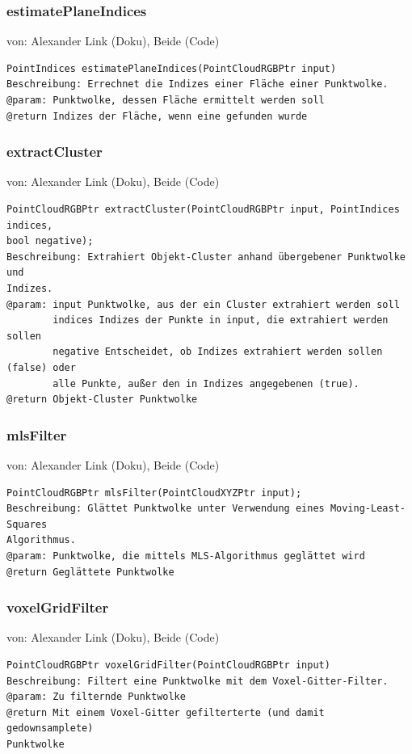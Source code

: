 \documentclass{suturo}
\makeatletter
\newcommand{\chapterauthor}[1]{%
  {\parindent0pt\vspace*{-27pt}%
  \linespread{0}\small\begin{flushright}von: #1\end{flushright}%
  \par\nobreak\vspace*{0pt}}
  \@afterheading%
}
\makeatother
\begin{document}
\subsubsection{estimatePlaneIndices}
\chapterauthor{Alexander Link (Doku), Beide (Code)}
\begin{verbatim}
PointIndices estimatePlaneIndices(PointCloudRGBPtr input)
Beschreibung: Errechnet die Indizes einer Fläche einer Punktwolke.
@param: Punktwolke, dessen Fläche ermittelt werden soll
@return Indizes der Fläche, wenn eine gefunden wurde
\end{verbatim}\label{func:estimateplaneindices}

\subsubsection{extractCluster}
\chapterauthor{Alexander Link (Doku), Beide (Code)}
\begin{verbatim}
PointCloudRGBPtr extractCluster(PointCloudRGBPtr input, PointIndices indices, 
bool negative);
Beschreibung: Extrahiert Objekt-Cluster anhand übergebener Punktwolke und
Indizes.
@param: input Punktwolke, aus der ein Cluster extrahiert werden soll
		indices Indizes der Punkte in input, die extrahiert werden sollen
		negative Entscheidet, ob Indizes extrahiert werden sollen (false) oder
		alle Punkte, außer den in Indizes angegebenen (true).
@return Objekt-Cluster Punktwolke
\end{verbatim}\label{func:extractcluster}

\subsubsection{mlsFilter}
\chapterauthor{Alexander Link (Doku), Beide (Code)}
\begin{verbatim}
PointCloudRGBPtr mlsFilter(PointCloudXYZPtr input);
Beschreibung: Glättet Punktwolke unter Verwendung eines Moving-Least-Squares
Algorithmus.
@param: Punktwolke, die mittels MLS-Algorithmus geglättet wird
@return Geglättete Punktwolke
\end{verbatim}\label{func:mlsfilter}

\subsubsection{voxelGridFilter}
\chapterauthor{Alexander Link (Doku), Beide (Code)}
\begin{verbatim}
PointCloudRGBPtr voxelGridFilter(PointCloudRGBPtr input)
Beschreibung: Filtert eine Punktwolke mit dem Voxel-Gitter-Filter.
@param: Zu filternde Punktwolke
@return Mit einem Voxel-Gitter gefilterterte (und damit gedownsamplete)
Punktwolke
\end{verbatim}\label{func:voxelgridfilter}
\end{document}
